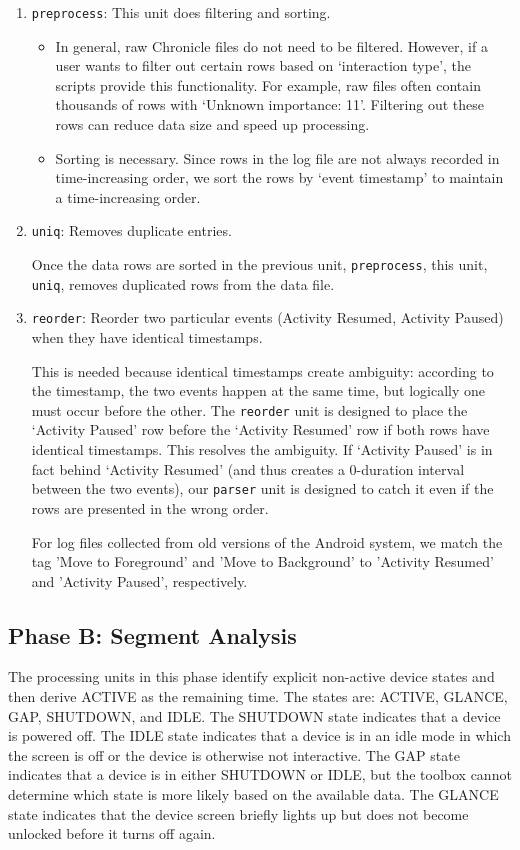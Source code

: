 \documentclass[11pt]{article}
\begin{document}
\begin{enumerate}
\item \verb+preprocess+: This unit does filtering and sorting. 
\begin{itemize}
\item In general, raw Chronicle files do not need to be filtered. However, if a user wants to filter out certain rows based on `interaction type', the scripts provide this functionality. For example, raw files often contain thousands of rows with `Unknown importance: 11'. Filtering out these rows can reduce data size and speed up processing.
\item Sorting is necessary. Since rows in the log file are not always recorded in time-increasing order, we sort the rows by `event timestamp' to maintain a time-increasing order.
\end{itemize}

\item \verb+uniq+: Removes duplicate entries. 

Once the data rows are sorted in the previous unit, \verb+preprocess+, this unit, \verb+uniq+, removes duplicated rows from the data file.

\item \verb+reorder+: Reorder two particular events (Activity Resumed, Activity Paused) when they have identical timestamps. 

This is needed because identical timestamps create ambiguity: according to the timestamp, the two events happen at the same time, but logically one must occur before the other. The \verb+reorder+ unit is designed to place the `Activity Paused' row before the `Activity Resumed' row if both rows have identical timestamps. This resolves the ambiguity. If `Activity Paused' is in fact behind `Activity Resumed' (and thus creates a 0-duration interval between the two events), our \verb+parser+ unit is designed to catch it even if the rows are presented in the wrong order.

For log files collected from old versions of the Android system, we match the tag 'Move to Foreground' and 'Move to Background' to 'Activity Resumed' and 'Activity Paused', respectively.

\end{enumerate}

\subsection{Phase B: Segment Analysis}
The processing units in this phase identify explicit non-active device states and then derive ACTIVE as the remaining time. The states are: ACTIVE, GLANCE, GAP, SHUTDOWN, and IDLE. The SHUTDOWN state indicates that a device is powered off. The IDLE state indicates that a device is in an idle mode in which the screen is off or the device is otherwise not interactive. The GAP state indicates that a device is in either SHUTDOWN or IDLE, but the toolbox cannot determine which state is more likely based on the available data. The GLANCE state indicates that the device screen briefly lights up but does not become unlocked before it turns off again.
\end{document}
